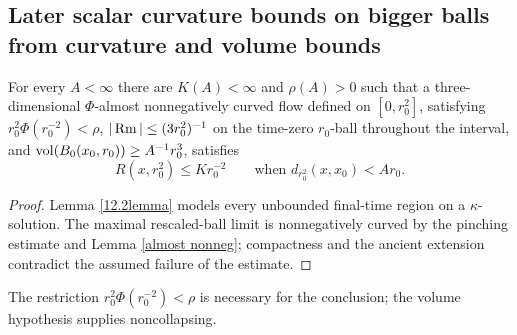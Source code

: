 \subsection{Later scalar curvature bounds on bigger balls from curvature and volume bounds}
\label{I.12.2}
\begin{theorem}
\label{thm:kl-later-scalar-curvature-bounds-bigger-balls-from-curvature-volume-bounds-positivity-scalar-curvature}

\label{thmI.12.2}
For every $A<\infty$ there are $K(A)<\infty$ and $\rho(A)>0$ such that a
three-dimensional $\Phi$-almost nonnegatively curved flow defined on
$[0,r_0^2]$, satisfying $r_0^2\Phi(r_0^{-2})<\rho$,
$|\operatorname{Rm}|\leq(3r_0^2)^{-1}$ on the time-zero $r_0$-ball throughout the interval,
and $\operatorname{vol}(B_0(x_0,r_0))\geq A^{-1}r_0^3$, satisfies
\[
R(x,r_0^2)\leq K r_0^{-2}\qquad\text{when }d_{r_0^2}(x,x_0)<Ar_0.
\]
\end{theorem}
\begin{proof}
\sketch Lemma \ref{12.2lemma} models every unbounded final-time region on a
$\kappa$-solution.  The maximal rescaled-ball limit is nonnegatively curved
by the pinching estimate and Lemma \ref{almost nonneg}; compactness and the
ancient extension contradict the assumed failure of the estimate.
\end{proof}
\begin{remark}
\label{rem:kl-later-scalar-curvature-bounds-bigger-balls-from-curvature-volume-bounds-existence-noncollapsing}

\label{rmkI.12.2}

The restriction $r_0^2\Phi(r_0^{-2})<\rho$ is necessary for the conclusion;
the volume hypothesis supplies noncollapsing.
\end{remark}
